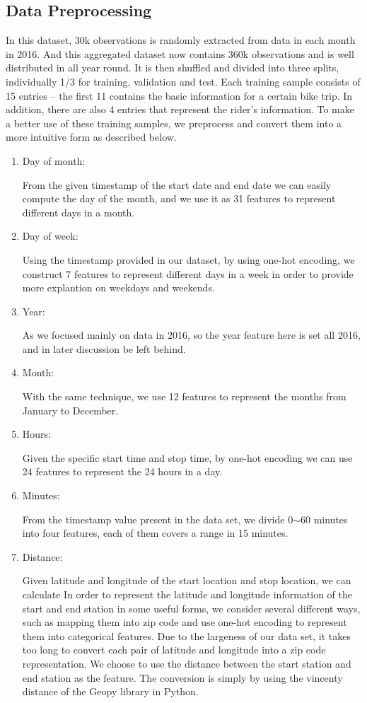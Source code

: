 \subsection{Data Preprocessing}
\par In this dataset, 30k observations is randomly extracted from data in each month in 2016. And this aggregated dataset now contains 360k observations and is well distributed in all year round. It is then shuffled and divided into three splits, individually 1/3 for training, validation and test. Each training sample consists of 15 entries -- the first 11 contains the basic information for a certain bike trip. In addition, there are also 4 entries that represent the rider's information. To make a better use of these training samples, we preprocess and convert them into a more intuitive form as described below.
\begin{enumerate}
	\item Day of month:
	\par From the given timestamp of the start date and end date we can easily compute the day of the month, and we use it as 31 features to represent different days in a month. 
	\item Day of week:
	\par Using the timestamp provided in our dataset, by using one-hot encoding, we construct 7 features to represent different days in a week in order to provide more explantion on weekdays and weekends.
	\item Year:
	\par As we focused mainly on data in 2016, so the year feature here is set all 2016, and in later discussion be left behind.
	\item Month:
	\par With the same technique, we use 12 features to represent the months from January to December.
	\item Hours:
	\par Given the specific start time and stop time, by one-hot encoding we can use 24 features to represent the 24 hours in a day.
	\item Minutes:
	\par From the timestamp value present in the data set, we divide 0$\sim$60 minutes into four features, each of them covers a range in 15 minutes.
	\item Distance:
	\par Given latitude and longitude of the start location and stop location, we can calculate 
	In order to represent the latitude and longitude information of the start and end station in some useful forms, we consider several different ways, such as mapping them into zip code and use one-hot encoding to represent them into categorical features. Due to the largeness of our data set, it takes too long to convert each pair of latitude and longitude into a zip code representation. We choose to use the distance between the start station and end station as the feature. The  conversion is simply by using the vincenty distance of the Geopy library in Python\cite{geopy}. 

\end{enumerate}
